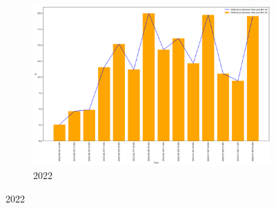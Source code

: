 \begin{figure}[h]
\begin{subfigure}{0.45\textwidth}
		\includegraphics[width=\textwidth]{graphs/2022/ISI_DIFFmaxMin.png}
		\caption{2022}
	\end{subfigure}
	\label{fig:daily_isi_dif_maxmin}
\end{figure}

